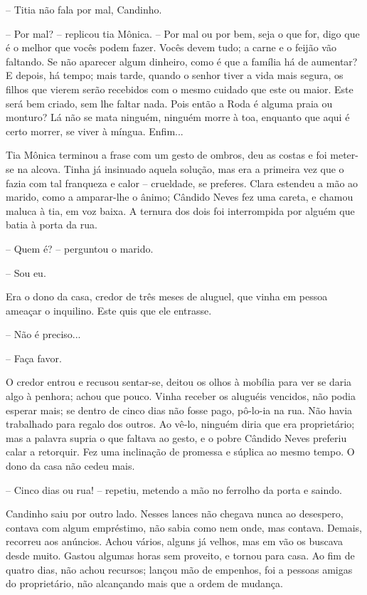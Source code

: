 -- Titia não fala por mal, Candinho.

-- Por mal? -- replicou tia Mônica. -- Por mal ou por bem, seja o que
for, digo que é o melhor que vocês podem fazer. Vocês devem tudo; a
carne e o feijão vão faltando. Se não aparecer algum dinheiro, como é
que a família há de aumentar? E depois, há tempo; mais tarde, quando o
senhor tiver a vida mais segura, os filhos que vierem serão recebidos
com o mesmo cuidado que este ou maior. Este será bem criado, sem lhe
faltar nada. Pois então a Roda é alguma praia ou monturo? Lá não se mata
ninguém, ninguém morre à toa, enquanto que aqui é certo morrer, se viver
à míngua. Enfim...

Tia Mônica terminou a frase com um gesto de ombros, deu as costas e foi
meter-se na alcova. Tinha já insinuado aquela solução, mas era a
primeira vez que o fazia com tal franqueza e calor -- crueldade, se
preferes. Clara estendeu a mão ao marido, como a amparar-lhe o ânimo;
Cândido Neves fez uma careta, e chamou maluca à tia, em voz baixa. A
ternura dos dois foi interrompida por alguém que batia à porta da rua.

-- Quem é? -- perguntou o marido.

-- Sou eu.

Era o dono da casa, credor de três meses de aluguel, que vinha em pessoa
ameaçar o inquilino. Este quis que ele entrasse.

-- Não é preciso...

-- Faça favor.

O credor entrou e recusou sentar-se, deitou os olhos à mobília para ver
se daria algo à penhora; achou que pouco. Vinha receber os aluguéis
vencidos, não podia esperar mais; se dentro de cinco dias não fosse
pago, pô-lo-ia na rua. Não havia trabalhado para regalo dos outros. Ao
vê-lo, ninguém diria que era proprietário; mas a palavra supria o que
faltava ao gesto, e o pobre Cândido Neves preferiu calar a retorquir.
Fez uma inclinação de promessa e súplica ao mesmo tempo. O dono da casa
não cedeu mais.

-- Cinco dias ou rua! -- repetiu, metendo a mão no ferrolho da porta e
saindo.

Candinho saiu por outro lado. Nesses lances não chegava nunca ao
desespero, contava com algum empréstimo, não sabia como nem onde, mas
contava. Demais, recorreu aos anúncios. Achou vários, alguns já velhos,
mas em vão os buscava desde muito. Gastou algumas horas sem proveito, e
tornou para casa. Ao fim de quatro dias, não achou recursos; lançou mão
de empenhos, foi a pessoas amigas do proprietário, não alcançando mais
que a ordem de mudança.

